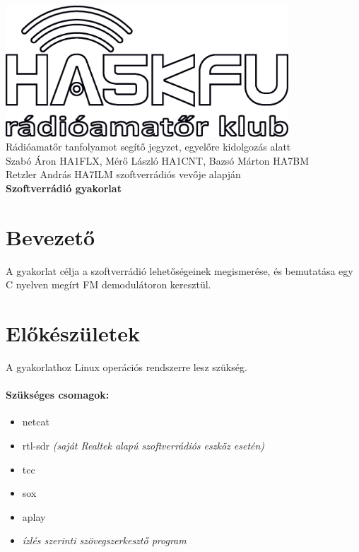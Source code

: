 \documentclass[12pt,a4paper]{article}
\begin{document}
\begin{center}
\includegraphics[width=300pt,keepaspectratio]{figures/ha5kfu.eps}
\\[0.5cm]
Rádióamatőr tanfolyamot segítő jegyzet, egyelőre kidolgozás alatt \\
Szabó Áron HA1FLX, Mérő László HA1CNT, Bazsó Márton HA7BM %
\\
Retzler András HA7ILM szoftverrádiós vevője alapján
\\[1cm]

{\huge \bfseries Szoftverrádió gyakorlat \\[2cm]}



\end{center}

\renewcommand{\contentsname}{Tartalom}\tableofcontents 
\newpage

\newpage

\section{Bevezető}
A gyakorlat célja a szoftverrádió lehetőségeinek megismerése, és bemutatása egy C nyelven megírt FM demodulátoron keresztül.

\section{Előkészületek}
A gyakorlathoz Linux operációs rendszerre lesz szükség.

\paragraph{Szükséges csomagok:} 
\begin{itemize}
	\item netcat
	\item rtl-sdr \textit{(saját Realtek alapú szoftverrádiós eszköz esetén)}
	\item tcc
	\item sox
	\item aplay
	\item \textit{ízlés szerinti szövegszerkesztő program }

\end{itemize}
\end{document}
